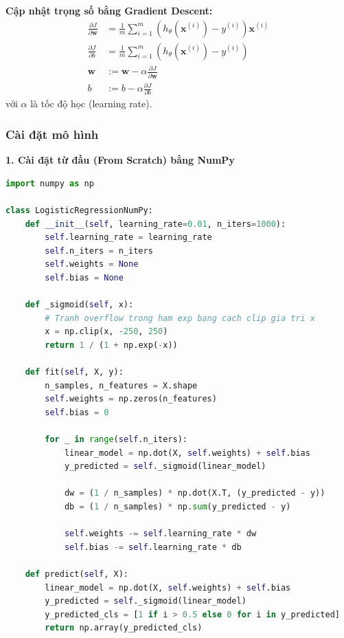 \textbf{Cập nhật trọng số bằng Gradient Descent:}
\begin{align}
\frac{\partial J}{\partial \mathbf{w}} &= \frac{1}{m} \sum_{i=1}^{m} \left( h_{\theta}(\mathbf{x}^{(i)}) - y^{(i)} \right) \mathbf{x}^{(i)} \\
\frac{\partial J}{\partial b} &= \frac{1}{m} \sum_{i=1}^{m} \left( h_{\theta}(\mathbf{x}^{(i)}) - y^{(i)} \right) \\
\mathbf{w} &:= \mathbf{w} - \alpha \frac{\partial J}{\partial \mathbf{w}} \\
b &:= b - \alpha \frac{\partial J}{\partial b}
\end{align}
với $\alpha$ là tốc độ học (learning rate).

\newpage
\subsubsection{Cài đặt mô hình}

\textbf{1. Cài đặt từ đầu (From Scratch) bằng NumPy}
\begin{lstlisting}[language=Python]
import numpy as np

class LogisticRegressionNumPy:
    def __init__(self, learning_rate=0.01, n_iters=1000):
        self.learning_rate = learning_rate
        self.n_iters = n_iters
        self.weights = None
        self.bias = None
        
    def _sigmoid(self, x):
        # Tranh overflow trong ham exp bang cach clip gia tri x
        x = np.clip(x, -250, 250)
        return 1 / (1 + np.exp(-x))
        
    def fit(self, X, y):
        n_samples, n_features = X.shape
        self.weights = np.zeros(n_features)
        self.bias = 0
        
        for _ in range(self.n_iters):
            linear_model = np.dot(X, self.weights) + self.bias
            y_predicted = self._sigmoid(linear_model)
            
            dw = (1 / n_samples) * np.dot(X.T, (y_predicted - y))
            db = (1 / n_samples) * np.sum(y_predicted - y)
            
            self.weights -= self.learning_rate * dw
            self.bias -= self.learning_rate * db
            
    def predict(self, X):
        linear_model = np.dot(X, self.weights) + self.bias
        y_predicted = self._sigmoid(linear_model)
        y_predicted_cls = [1 if i > 0.5 else 0 for i in y_predicted]
        return np.array(y_predicted_cls)
\end{lstlisting}

